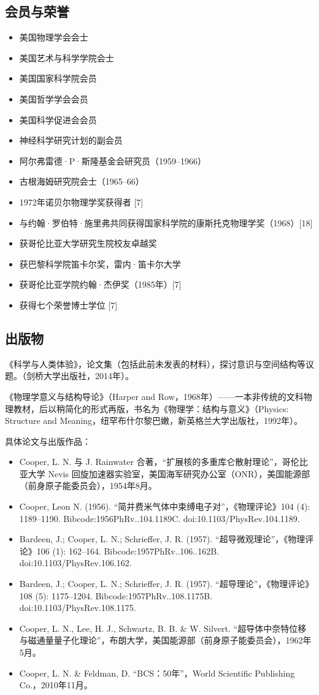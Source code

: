 \subsection{会员与荣誉}
\begin{itemize}
\item 美国物理学会会士 
\item 美国艺术与科学学院会士 
\item 美国国家科学院会员
\item 美国哲学学会会员 
\item 美国科学促进会会员 
\item 神经科学研究计划的副会员 
\item 阿尔弗雷德·P·斯隆基金会研究员（1959–1966）
\item 古根海姆研究院会士（1965–66）
\item 1972年诺贝尔物理学奖获得者 [7]
\item 与约翰·罗伯特·施里弗共同获得国家科学院的康斯托克物理学奖（1968）[18]
\item 获哥伦比亚大学研究生院校友卓越奖 
\item 获巴黎科学院笛卡尔奖，雷内·笛卡尔大学
\item 获哥伦比亚学院约翰·杰伊奖（1985年）[7]
\item 获得七个荣誉博士学位 [7]
\end{itemize}
\subsection{出版物}
《科学与人类体验》，论文集（包括此前未发表的材料），探讨意识与空间结构等议题。（剑桥大学出版社，2014年）。

《物理学意义与结构导论》（Harper and Row，1968年）——一本非传统的文科物理教材，后以稍简化的形式再版，书名为《物理学：结构与意义》（Physics: Structure and Meaning，纽罕布什尔黎巴嫩，新英格兰大学出版社，1992年）。

具体论文与出版作品：
\begin{itemize}
\item Cooper, L. N. 与 J. Rainwater 合著，“扩展核的多重库仑散射理论”，哥伦比亚大学 Nevis 回旋加速器实验室，美国海军研究办公室（ONR），美国能源部（前身原子能委员会），1954年8月。
\item Cooper, Leon N. (1956). “简并费米气体中束缚电子对”，《物理评论》104 (4): 1189–1190. Bibcode:1956PhRv..104.1189C. doi:10.1103/PhysRev.104.1189.
\item Bardeen, J.; Cooper, L. N.; Schrieffer, J. R. (1957). “超导微观理论”，《物理评论》106 (1): 162–164. Bibcode:1957PhRv..106..162B. doi:10.1103/PhysRev.106.162.
\item Bardeen, J.; Cooper, L. N.; Schrieffer, J. R. (1957). “超导理论”，《物理评论》108 (5): 1175–1204. Bibcode:1957PhRv..108.1175B. doi:10.1103/PhysRev.108.1175.
\item Cooper, L. N., Lee, H. J., Schwartz, B. B. & W. Silvert. “超导体中奈特位移与磁通量量子化理论”，布朗大学，美国能源部（前身原子能委员会），1962年5月。
\item Cooper, L. N. & Feldman, D. “BCS：50年”，World Scientific Publishing Co.，2010年11月。
\end{itemize}
